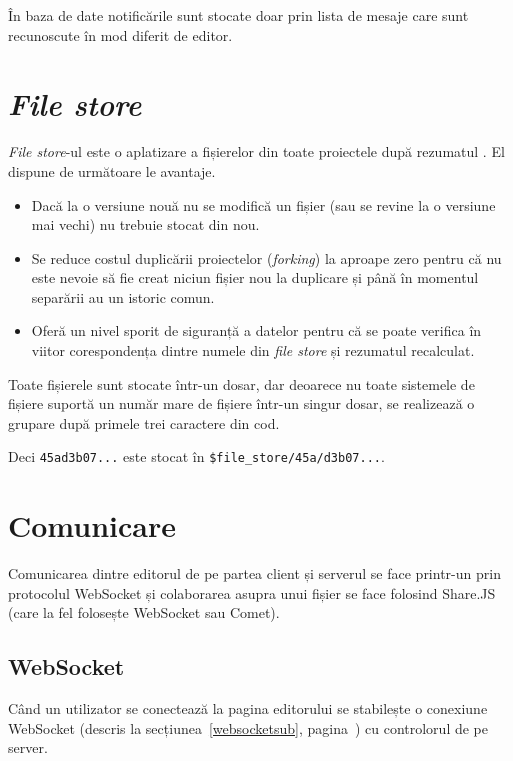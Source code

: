 \documentclass[a4wide,12pt]{report}
\newcommand{\eng}[1]{\emph{#1}} %
\newcommand{\cod}[1]{\texttt{#1}}
\newcommand{\acr}[1]{{\textsmaller[1]{\textsc{#1}}}} %
\begin{document}
În baza de date notificările sunt stocate doar prin lista de mesaje care sunt
recunoscute în mod diferit de editor.

\section{\eng{File store}}

\eng{File store}-ul este o aplatizare a fișierelor din toate proiectele după
rezumatul \acr{SHA1}. El dispune de următoare le avantaje.

\begin{itemize}

\item Dacă la o versiune nouă nu se modifică un fișier (sau se revine la o
versiune mai vechi) nu trebuie stocat din nou.

\item Se reduce costul duplicării proiectelor (\eng{forking}) la aproape zero
pentru că nu este nevoie să fie creat niciun fișier nou la duplicare și până în
momentul separării au un istoric comun.

\item Oferă un nivel sporit de siguranță a datelor pentru că se poate verifica
în viitor corespondența dintre numele din \eng{file store} și rezumatul
\acr{SHA1} recalculat.

\end{itemize}

Toate fișierele sunt stocate într-un dosar, dar deoarece nu toate sistemele de
fișiere suportă un număr mare de fișiere într-un singur dosar, se realizează o
grupare după primele trei caractere din cod.

Deci \cod{45ad3b07...} este stocat în \cod{\$file\_store/45a/d3b07...}.

\section{Comunicare}

Comunicarea dintre editorul de pe partea client și serverul se face printr-un
\acr{RPC} prin protocolul WebSocket și colaborarea asupra unui fișier se face
folosind Share.JS (care la fel folosește WebSocket sau Comet).

\subsection{WebSocket}

Când un utilizator se conectează la pagina editorului se stabilește o conexiune
WebSocket (descris la secțiunea~\ref{websocketsub},
pagina~\pageref{websocketsub}) cu controlorul de pe server.
\end{document}

